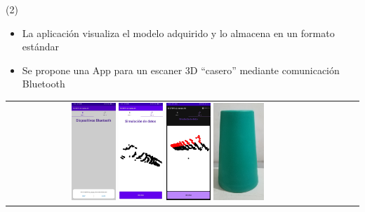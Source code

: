 \begin{frame}{ (2)}
	\begin{itemize}
        \item La aplicación visualiza el modelo adquirido y lo almacena en un formato estándar
        \item Se propone una App para un escaner 3D ``casero'' mediante comunicación Bluetooth
	\end{itemize}
\begin{center}
 \begin{tabular}{cccc}
    \includegraphics[width=0.14\textwidth]{2022_Scanner3D/figs/Ap1}
    \includegraphics[width=0.14\textwidth]{2022_Scanner3D/figs/Ap2}
    \includegraphics[width=0.14\textwidth]{2022_Scanner3D/figs/Ap3}
    \includegraphics[width=0.16\textwidth]{2022_Scanner3D/figs/Ap4}
  \end{tabular}
\end{center}

\end{frame}






